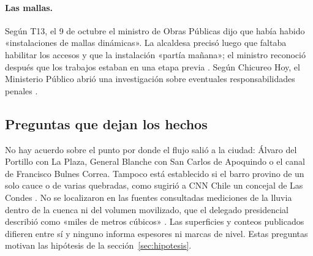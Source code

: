\paragraph{Las mallas.} Según T13, el 9 de octubre el ministro de Obras Públicas dijo que había habido «instalaciones de mallas dinámicas». La alcaldesa precisó luego que faltaba habilitar los accesos y que la instalación «partía mañana»; el ministro reconoció después que los trabajos estaban en una etapa previa \citep{t13_2026mallas}. Según Chicureo Hoy, el Ministerio Público abrió una investigación sobre eventuales responsabilidades penales \citep{chicureohoy2026}.

\subsection*{Preguntas que dejan los hechos}
No hay acuerdo sobre el punto por donde el flujo salió a la ciudad: Álvaro del Portillo con La Plaza, General Blanche con San Carlos de Apoquindo o el canal de Francisco Bulnes Correa. Tampoco está establecido si el barro provino de un solo cauce o de varias quebradas, como sugirió a CNN Chile un concejal de Las Condes \citep{cnnchile2026haddad}. No se localizaron en las fuentes consultadas mediciones de la lluvia dentro de la cuenca ni del volumen movilizado, que el delegado presidencial describió como «miles de metros cúbicos» \citep{cooperativa2026alcaldesa}. Las superficies y conteos publicados difieren entre sí y ninguno informa espesores ni marcas de nivel. Estas preguntas motivan las hipótesis de la sección~\ref{sec:hipotesis}.
